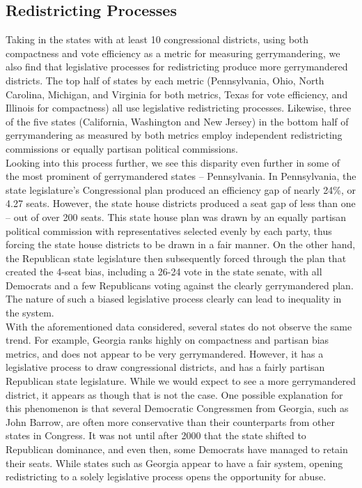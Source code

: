 \documentclass[12pt]{article}
\begin{document}
 \subsection{Redistricting Processes}
Taking in the states with at least 10 congressional districts, using both compactness and vote efficiency as a metric for measuring gerrymandering, we also find that legislative processes for redistricting produce more gerrymandered districts. The top half of states by each metric (Pennsylvania, Ohio, North Carolina, Michigan, and Virginia for both metrics, Texas for vote efficiency, and Illinois for compactness) all use legislative redistricting processes.  Likewise, three of the five states (California, Washington and New Jersey) in the bottom half of gerrymandering as measured by both metrics employ independent redistricting commissions or equally partisan political commissions.\\
Looking into this process further, we see this disparity even further in some of the most prominent of gerrymandered states -- Pennsylvania.  In Pennsylvania, the state legislature's Congressional plan produced an efficiency gap of nearly 24\%, or 4.27 seats.  However, the state house districts produced a seat gap of less than one -- out of over 200 seats.  This state house plan was drawn by an equally partisan political commission with representatives selected evenly by each party, thus forcing the state house districts to be drawn in a fair manner.  On the other hand, the Republican state legislature then subsequently forced through the plan that created the 4-seat bias, including a 26-24 vote in the state senate, with all Democrats and a few Republicans voting against the clearly gerrymandered plan.  The nature of such a biased legislative process clearly can lead to inequality in the system.  \\

With the aforementioned data considered, several states do not observe the same trend.  For example, Georgia ranks highly on compactness and partisan bias metrics, and does not appear to be very gerrymandered.  However, it has a legislative process to draw congressional districts, and has a fairly partisan Republican state legislature.  While we would expect to see a more gerrymandered district, it appears as though that is not the case.  One possible explanation for this phenomenon is that several Democratic Congressmen from Georgia, such as John Barrow, are often more conservative than their counterparts from other states in Congress.  It was not until after 2000 that the state shifted to Republican dominance, and even then, some Democrats have managed to retain their seats.  While states such as Georgia appear to have a fair system, opening redistricting to a solely legislative process opens the opportunity for abuse.
\end{document}
